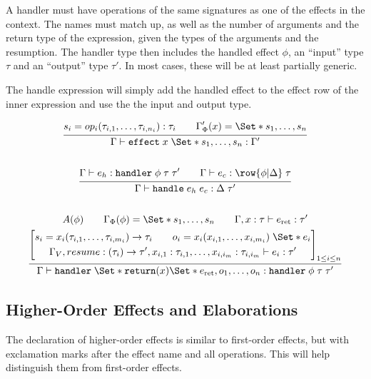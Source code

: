 \documentclass{article}
\newcommand\kw[1]{\ensuremath{\mathbf{\mathtt{#1}}}}
\newcommand\handler{\kw{handler}}
\newcommand\return{\kw{return}}
\newcommand\handle{\kw{handle}}
\renewcommand\S{\Set*}
\let\oldinfer\infer
\renewcommand\infer[2]{\oldinfer{#1}{\begin{gathered}#2\end{gathered}}}
\begin{document}
A handler must have operations of the same signatures as one of the effects in the context. The names must match up, as well as the number of arguments and the return type of the expression, given the types of the arguments and the resumption. The handler type then includes the handled effect $\phi$, an ``input'' type $\tau$ and an ``output'' type $\tau'$. In most cases, these will be at least partially generic.

The handle expression will simply add the handled effect to the effect row of the inner expression and use the the input and output type.

\begin{gather*}
    \infer{
        \Gamma \vdash \kw{effect}\;x\;\S{s_1, \dots, s_n}: \Gamma'
    }{
        s_i = op_i(\tau_{i,1},\dots, \tau_{i,n_i}): \tau_i
        \qquad
        \Gamma'_\Phi(x) = \S{s_1, \dots, s_n}
    }
    \\\\
    \infer{
        \Gamma \vdash \handle\;e_h\;e_c : \Delta\;\tau'
    }{
        \Gamma \vdash e_h : \handler\;\phi\;\tau\;\tau'
        \qquad
        \Gamma \vdash e_c : \row{\phi | \Delta}\;\tau
    }
    \\\\
    \infer{
        \Gamma \vdash \handler\;\S{ \return(x) \S{ e_{\text{ret}} }, o_1, \dots, o_n }
        : \handler\;\phi\;\tau\;\tau'
    }{
        A(\phi)
        \qquad
        \Gamma_\Phi(\phi) = \S{ s_1, \dots, s_n }
        \qquad
        \Gamma, x: \tau \vdash e_{\text{ret}} : \tau' 
        \\
        \left[
            \begin{gathered}
                s_i = x_i(\tau_{i,1}, \dots, \tau_{i,m_i}) \to \tau_i
                \qquad
                o_i = x_i(x_{i,1}, \dots, x_{i,m_i})\;\S{ e_i }
                \\
                \Gamma_V, resume : (\tau_i) \to \tau', x_{i,1}: \tau_{i,1}, \dots, x_{i,i_m}: \tau_{i,i_m} 
                \vdash e_i: \tau'
            \end{gathered}
        \right]_{1\leq i\leq n}
    }
\end{gather*}

\subsection{Higher-Order Effects and Elaborations}

The declaration of higher-order effects is similar to first-order effects, but with exclamation marks after the effect name and all operations. This will help distinguish them from first-order effects.
\end{document}
